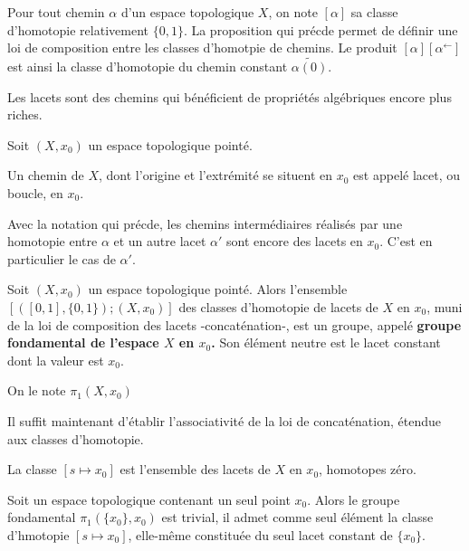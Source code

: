 Pour tout chemin $\alpha$ d'un espace topologique $X$, %
on note $[\alpha ]$ sa classe d'homotopie relativement  $\{0,1\}$. %
La proposition qui pr\'ecde permet de d\'efinir une loi de composition entre les classes d'homotpie de chemins. %
Le produit $[\alpha ][\alpha^{\leftarrow}]$ est ainsi la classe d'homotopie du chemin constant $\tilde{\alpha (0)}$.

Les lacets sont des chemins qui b\'en\'eficient de propri\'et\'es alg\'ebriques encore plus riches.

\begin{defi}[Lacets]
Soit $(X,x_0)$ un espace topologique point\'e.

Un chemin de $X$, dont l'origine et l'extr\'emit\'e se situent en $x_0$ est appel\'e lacet, ou boucle, en $x_0$.
\end{defi}

\begin{rema}
Avec la notation qui pr\'ecde, les chemins interm\'ediaires r\'ealis\'es par une homotopie entre $\alpha$ et un autre lacet $\alpha '$ %
sont encore des lacets en $x_0$. C'est en particulier le cas de $\alpha '$.
\end{rema}

\begin{prefi}
Soit $(X,x_0)$ un espace topologique point\'e. %
Alors l'ensemble $[([0,1],\{0,1\});(X,x_0)]$ des classes d'homotopie de lacets de $X$ en $x_0$, %
muni de la loi de composition des lacets -concat\'enation-, est un groupe, appel\'e %
\textbf{groupe fondamental de l'espace $X$ en $x_0$.} Son \'el\'ement neutre est le lacet constant dont la valeur est $x_0$.

On le note $\pi_1(X,x_0)$
\end{prefi}

\es Il suffit maintenant d'\'etablir l'associativit\'e de la loi de concat\'enation, \'etendue aux classes d'homotopie.

\begin{rema}
La classe $[s\mapsto x_0]$ est l'ensemble des lacets de $X$ en $x_0$, homotopes  z\'ero.
\end{rema}

\begin{exem}
Soit un espace topologique contenant un seul point $x_0$. Alors le groupe fondamental $\pi_1(\{x_0\},x_0)$ est trivial, %
il admet comme seul \'el\'ement la classe d'hmotopie $[s\mapsto x_0]$, elle-m\^eme constitu\'ee du seul lacet constant de $\{x_0\}$.
\end{exem}

